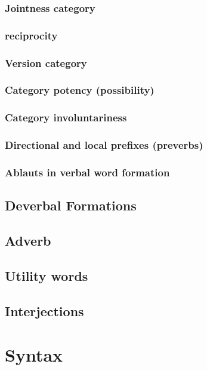\documentclass[a4paper,12pt]{book}
\newcommand{\1}[1]{\textbf{\emph{#1}}} %
\newcommand{\2}[1]{\textbf{[#1]}} %
\newcommand{\3}[1]{\fontsize{11pt}{0cm}\textbf{\emph{#1}}} %
\newcommand{\4}[1]{\fontsize{10pt}{0cm}\emph{#1}}	%
\newcommand{\5}[1]{\textbf{/#1/}} %
\newcommand{\6}[1]{\textbf{[#1]}} %
\newcommand{\7}[1]{\fontsize{12pt}{0cm}\emph{#1}} %
\newcommand{\8}[1]{\fontsize{12pt}{0cm}`#1'} %
\newcommand{\9}[1]{\fontsize{12pt}{0cm}(lit. `#1')} %
\begin{document}
\subsection{Jointness category}
\subsection{reciprocity}
\subsection{Version category}
\subsection{Category potency (possibility)}
\subsection{Category involuntariness}
\subsection{Directional and local prefixes (preverbs)}
\subsection{Ablauts in verbal word formation}

\section{Deverbal Formations}
\section{Adverb}
\section{Utility words}
\section{Interjections}
\chapter{Syntax}
\end{document}

